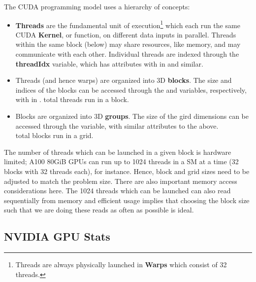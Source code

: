 \documentclass[11pt]{article}
\begin{document}
The CUDA programming model uses a hierarchy of concepts:
\begin{itemize}
    \item \textbf{Threads}  are the fundamental unit of execution\footnote{Threads are always
        physically launched in \textbf{Warps} which consist of 32 threads.} which each run the same
        CUDA \textbf{Kernel}, or function, on different data inputs in parallel. Threads within the
        same block (below) may share resources, like memory, and may communicate with each other.
        Individual threads are indexed through the \textbf{threadIdx} variable, which has
         attributes with  in
         and similar.

	\item Threads (and hence warps) are organized into 3D \textbf{blocks}. The size and indices of
	      the blocks can be accessed through the  and 
	      variables, respectively, with  in .
	       total threads run in a block.
	\item Blocks are organized into 3D \textbf{groups}. The size of the gird dimensions can be
	      accessed through the  variable, with similar attributes to the above. \\
	       total blocks run in a grid.
\end{itemize}

The number of threads which can be launched in a given block is hardware limited; A100 80GiB GPUs
can run up to 1024 threads in a SM at a time (32 blocks with 32 threads each), for instance. Hence,
block and grid sizes need to be adjusted to match the problem size. There are also important memory
access considerations here. The 1024 threads which can be launched can also read sequentially from
memory and efficient usage implies that choosing the block size such that we are doing these reads
as often as possible is ideal.

\subsection{NVIDIA GPU Stats \label{app_gpu_stats}}
\end{document}
